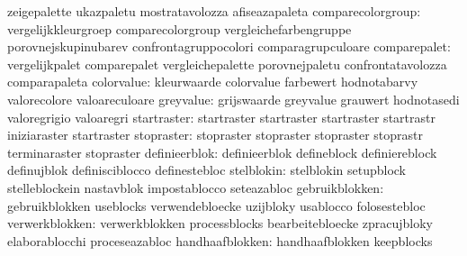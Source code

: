                                   zeigepalette                     ukazpaletu
                                  mostratavolozza                  afiseazapaleta
              comparecolorgroup:  vergelijkkleurgroep              comparecolorgroup
                                  vergleichefarbengruppe           porovnejskupinubarev
                                  confrontagruppocolori            comparagrupculoare
                   comparepalet:  vergelijkpalet                   comparepalet
                                  vergleichepalette                porovnejpaletu
                                  confrontatavolozza               comparapaleta
                     colorvalue:  kleurwaarde                      colorvalue
                                  farbewert                        hodnotabarvy
                                  valorecolore                     valoareculoare
                      greyvalue:  grijswaarde                      greyvalue
                                  grauwert                         hodnotasedi
                                  valoregrigio                     valoaregri
                    startraster:  startraster                      startraster
                                  startraster                      startrastr
                                  iniziaraster                     startraster %
                     stopraster:  stopraster                       stopraster
                                  stopraster                       stoprastr
                                  terminaraster                    stopraster
                  definieerblok:  definieerblok                    defineblock
                                  definiereblock                   definujblok
                                  definisciblocco                  definestebloc
                     stelblokin:  stelblokin                       setupblock
                                  stelleblockein                   nastavblok
                                  impostablocco                    seteazabloc
                 gebruikblokken:  gebruikblokken                   useblocks
                                  verwendebloecke                  uzijbloky
                                  usablocco                        folosestebloc
                 verwerkblokken:  verwerkblokken                   processblocks
                                  bearbeitebloecke                 zpracujbloky
                                  elaborablocchi                   proceseazabloc
                handhaafblokken:  handhaafblokken                  keepblocks
